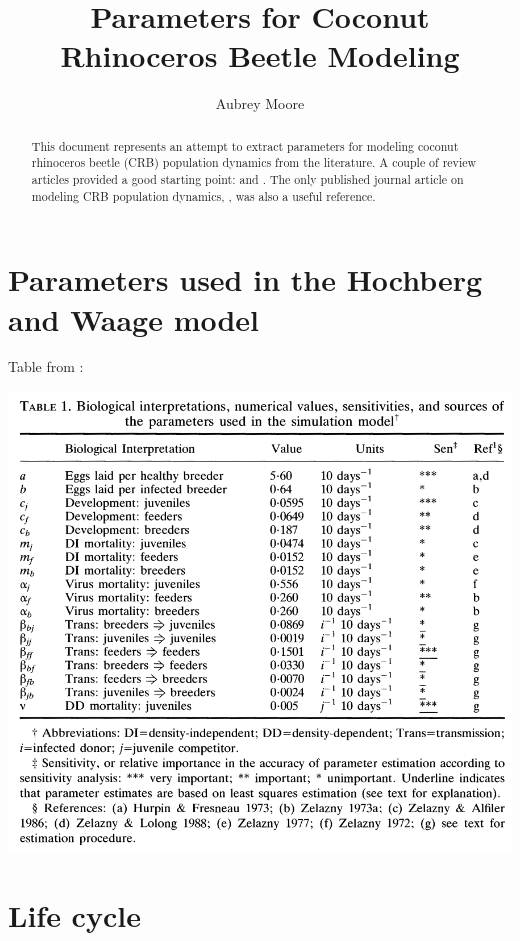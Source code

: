 \documentclass[12pt,letterpaper,english,bibliography=totocnumbered, abstract=on]{scrartcl}
\begin{document}
\title{Parameters for Coconut Rhinoceros Beetle Modeling}

\author{Aubrey Moore}

\maketitle
\newpage
\tableofcontents
\pagebreak

\begin{abstract}
	This document represents an attempt to extract parameters for modeling coconut rhinoceros beetle (CRB) population dynamics from the literature. A couple of review articles provided a good starting point: \cite{bedford_biology_1980} and \cite{pallipparambil_new_2015}. The only published journal article on modeling CRB population dynamics, \cite{hochberg_model_1991}, was also a useful reference. 
\end{abstract}

\section{Parameters used in the Hochberg and Waage model}

Table from \cite{hochberg_model_1991}:
\begin{center}
	\includegraphics[width=0.7\linewidth]{../images/hochberg-model-params}
\end{center}


\section{Life cycle}
\end{document}
